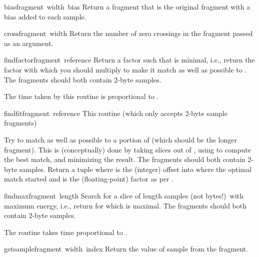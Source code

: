 \begin{funcdesc}{bias}{fragment\, width\, bias}
Return a fragment that is the original fragment with a bias added to
each sample.
\end{funcdesc}

\begin{funcdesc}{cross}{fragment\, width}
Return the number of zero crossings in the fragment passed as an
argument.
\end{funcdesc}

\begin{funcdesc}{findfactor}{fragment\, reference}
Return a factor  such that
 is minimal, i.e.,
return the factor with which you should multiply  to
make it match as well as possible to .  The fragments
should both contain 2-byte samples.

The time taken by this routine is proportional to . 
\end{funcdesc}

\begin{funcdesc}{findfit}{fragment\, reference}
This routine (which only accepts 2-byte sample fragments)

Try to match  as well as possible to a portion of
 (which should be the longer fragment).  This is
(conceptually) done by taking slices out of , using
 to compute the best match, and minimizing the
result.  The fragments should both contain 2-byte samples.  Return a
tuple  where  is the
(integer) offset into  where the optimal match started
and  is the (floating-point) factor as per
.
\end{funcdesc}

\begin{funcdesc}{findmax}{fragment\, length}
Search  for a slice of length  samples (not
bytes!)\ with maximum energy, i.e., return  for which
 is maximal.  The fragments
should both contain 2-byte samples.

The routine takes time proportional to .
\end{funcdesc}

\begin{funcdesc}{getsample}{fragment\, width\, index}
Return the value of sample  from the fragment.
\end{funcdesc}

